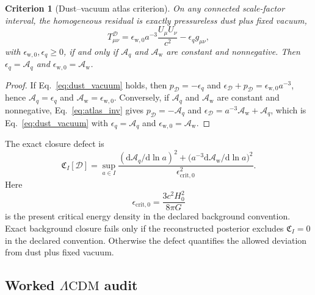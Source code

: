 \documentclass[
  aps,
  prd,
  reprint,
  superscriptaddress,
  floatfix,
  nofootinbib,
  longbibliography
]{revtex4-2}
\theoremstyle{plain}
\newtheorem{criterion}[theorem]{Criterion}
\theoremstyle{definition}
\theoremstyle{remark}
\newcommand{\dd}{\mathrm d}
\newcommand{\D}{\mathcal D}
\newcommand{\crit}{\mathrm{crit}}
\newcommand{\w}{\mathrm w}
\newcommand{\Aq}{\mathcal A_q}
\newcommand{\Aw}{\mathcal A_{\mathrm w}}
\newcommand{\LCDM}{\Lambda\mathrm{CDM}}
\begin{document}
\begin{criterion}[Dust--vacuum atlas criterion]
On any connected scale-factor interval, the homogeneous residual is exactly pressureless dust plus fixed vacuum,
\begin{equation}
T^{\D}_{\mu\nu}=\epsilon_{\w,0}a^{-3}\frac{U_\mu U_\nu}{c^2}-\epsilon_q g_{\mu\nu},
\label{eq:dust_vacuum}
\end{equation}
with $\epsilon_{\w,0},\epsilon_q\ge0$, if and only if $\Aq$ and $\Aw$ are constant and nonnegative.  Then $\epsilon_q=\Aq$ and $\epsilon_{\w,0}=\Aw$.
\end{criterion}

\begin{proof}
If Eq.~\eqref{eq:dust_vacuum} holds, then $p_\D=-\epsilon_q$ and $\epsilon_\D+p_\D=\epsilon_{\w,0}a^{-3}$, hence $\Aq=\epsilon_q$ and $\Aw=\epsilon_{\w,0}$.  Conversely, if $\Aq$ and $\Aw$ are constant and nonnegative, Eq.~\eqref{eq:atlas_inv} gives $p_\D=-\Aq$ and $\epsilon_\D=a^{-3}\Aw+\Aq$, which is Eq.~\eqref{eq:dust_vacuum} with $\epsilon_q=\Aq$ and $\epsilon_{\w,0}=\Aw$.
\end{proof}

The exact closure defect is
\begin{equation}
\mathfrak C_I[\D]=
\sup_{a\in I}
\frac{(\dd\Aq/\dd\ln a)^2+\bigl(a^{-3}\dd\Aw/\dd\ln a\bigr)^2}{\epsilon_{\crit,0}^2}.
\label{eq:closure_defect}
\end{equation}
Here
\begin{equation}
\epsilon_{\crit,0}=\frac{3c^2H_0^2}{8\pi G}
\label{eq:critical_energy_density}
\end{equation}
is the present critical energy density in the declared background convention.  Exact background closure fails only if the reconstructed posterior excludes $\mathfrak C_I=0$ in the declared convention.  Otherwise the defect quantifies the allowed deviation from dust plus fixed vacuum.

\subsection{Worked \texorpdfstring{$\LCDM$}{LCDM} audit}
\end{document}
